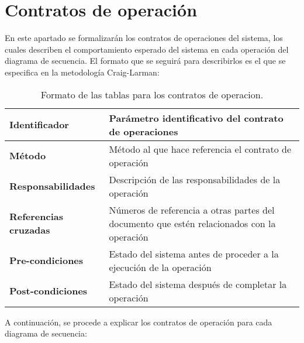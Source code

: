 \chapter{Contratos de operación}

\par En este apartado se formalizarán los contratos de operaciones del sistema, los cuales describen el comportamiento esperado del sistema en cada operación del diagrama de secuencia. El formato que se seguirá para describirlos es el que se especifica en la metodología Craig-Larman:

\begin{table}[h]
\begin{center}
\begin{tabular}{p{} p{11cm}} \hline \hline
\textbf{Identificador} & Parámetro identificativo del contrato de operaciones \\ \hline
\textbf{Método} & Método al que hace referencia el contrato de operación \\ \hline
\textbf{Responsabilidades} & Descripción de las responsabilidades de la operación \\ \hline
\textbf{Referencias cruzadas} & Números de referencia a otras partes del documento que estén relacionados con la operación \\ \hline
\textbf{Pre-condiciones} & Estado del sistema antes de proceder a la ejecución de la operación \\ \hline
\textbf{Post-condiciones} & Estado del sistema después de completar la operación  \\ \hline
\end{tabular}
\caption{Formato de las tablas para los contratos de operacion.}
\label{tab:formatoCO}
\end{center}
\end{table}

\par A continuación, se procede a explicar los contratos de operación para cada diagrama de secuencia:


